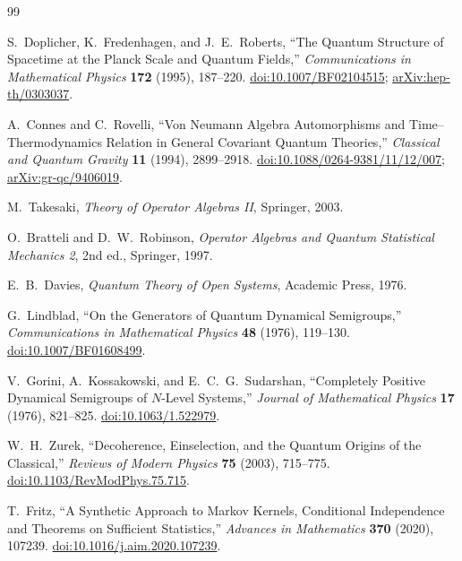 \documentclass[a4paper,11pt]{ltjsarticle}
\theoremstyle{remark}
\begin{document}
\begin{thebibliography}{99}

S.~Doplicher, K.~Fredenhagen, and J.~E.~Roberts,
``The Quantum Structure of Spacetime at the Planck Scale and Quantum Fields,''
\textit{Communications in Mathematical Physics} \textbf{172} (1995), 187--220.
\href{https://doi.org/10.1007/BF02104515}{doi:10.1007/BF02104515};
\href{https://arxiv.org/abs/hep-th/0303037}{arXiv:hep-th/0303037}.

A.~Connes and C.~Rovelli,
``Von Neumann Algebra Automorphisms and Time--Thermodynamics Relation in General Covariant Quantum Theories,''
\textit{Classical and Quantum Gravity} \textbf{11} (1994), 2899--2918.
\href{https://doi.org/10.1088/0264-9381/11/12/007}{doi:10.1088/0264-9381/11/12/007};
\href{https://arxiv.org/abs/gr-qc/9406019}{arXiv:gr-qc/9406019}.

M.~Takesaki,
\textit{Theory of Operator Algebras II},
Springer, 2003.

O.~Bratteli and D.~W.~Robinson,
\textit{Operator Algebras and Quantum Statistical Mechanics 2}, 2nd ed.,
Springer, 1997.

E.~B.~Davies,
\textit{Quantum Theory of Open Systems},
Academic Press, 1976.

G.~Lindblad,
``On the Generators of Quantum Dynamical Semigroups,''
\textit{Communications in Mathematical Physics} \textbf{48} (1976), 119--130.
\href{https://doi.org/10.1007/BF01608499}{doi:10.1007/BF01608499}.

V.~Gorini, A.~Kossakowski, and E.~C.~G.~Sudarshan,
``Completely Positive Dynamical Semigroups of $N$-Level Systems,''
\textit{Journal of Mathematical Physics} \textbf{17} (1976), 821--825.
\href{https://doi.org/10.1063/1.522979}{doi:10.1063/1.522979}.

W.~H.~Zurek,
``Decoherence, Einselection, and the Quantum Origins of the Classical,''
\textit{Reviews of Modern Physics} \textbf{75} (2003), 715--775.
\href{https://doi.org/10.1103/RevModPhys.75.715}{doi:10.1103/RevModPhys.75.715}.

T.~Fritz,
``A Synthetic Approach to Markov Kernels, Conditional Independence and Theorems on Sufficient Statistics,''
\textit{Advances in Mathematics} \textbf{370} (2020), 107239.
\href{https://doi.org/10.1016/j.aim.2020.107239}{doi:10.1016/j.aim.2020.107239}.


\end{thebibliography}
\end{document}
